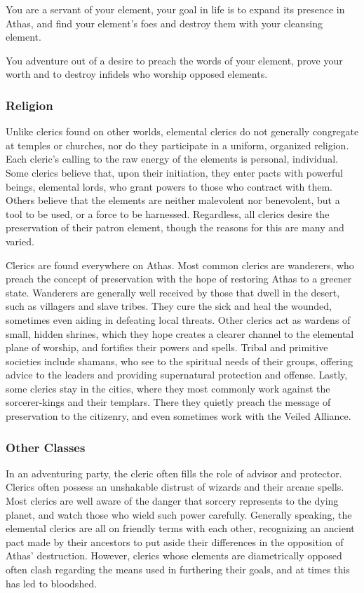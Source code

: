 You are a servant of your element, your goal in life is to expand its presence in Athas, and find your element's foes and destroy them with your cleansing element.

You adventure out of a desire to preach the words of your element, prove your worth and to destroy infidels who worship opposed elements.

\subsubsection{Religion}
Unlike clerics found on other worlds, elemental clerics do not generally congregate at temples or churches, nor do they participate in a uniform, organized religion. Each cleric's calling to the raw energy of the elements is personal, individual. Some clerics believe that, upon their initiation, they enter pacts with powerful beings, elemental lords, who grant powers to those who contract with them. Others believe that the elements are neither malevolent nor benevolent, but a tool to be used, or a force to be harnessed. Regardless, all clerics desire the preservation of their patron element, though the reasons for this are many and varied.

Clerics are found everywhere on Athas. Most common clerics are wanderers, who preach the concept of preservation with the hope of restoring Athas to a greener state. Wanderers are generally well received by those that dwell in the desert, such as villagers and slave tribes. They cure the sick and heal the wounded, sometimes even aiding in defeating local threats. Other clerics act as wardens of small, hidden shrines, which they hope creates a clearer channel to the elemental plane of worship, and fortifies their powers and spells. Tribal and primitive societies include shamans, who see to the spiritual needs of their groups, offering advice to the leaders and providing supernatural protection and offense. Lastly, some clerics stay in the cities, where they most commonly work against the sorcerer-kings and their templars. There they quietly preach the message of preservation to the citizenry, and even sometimes work with the Veiled Alliance.

\subsubsection{Other Classes}
In an adventuring party, the cleric often fills the role of advisor and protector. Clerics often possess an unshakable distrust of wizards and their arcane spells. Most clerics are well aware of the danger that sorcery represents to the dying planet, and watch those who wield such power carefully. Generally speaking, the elemental clerics are all on friendly terms with each other, recognizing an ancient pact made by their ancestors to put aside their differences in the opposition of Athas' destruction. However, clerics whose elements are diametrically opposed often clash regarding the means used in furthering their goals, and at times this has led to bloodshed.

